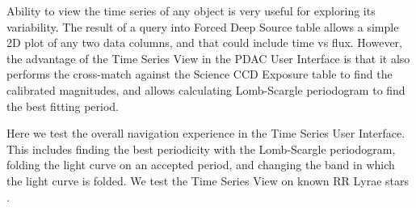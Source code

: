 \documentclass[DM,lsstdraft,toc,usenatbib]{lsstdoc}
\begin{document}
Ability to view the time series of any object is very useful for exploring its variability. The result of a query into Forced Deep Source table allows a simple 2D plot of any two data columns, and that could include time vs flux. However,  the advantage of the Time Series View in the PDAC User Interface is that it also performs the cross-match against the Science CCD Exposure table to find the calibrated magnitudes, and allows calculating Lomb-Scargle periodogram to find the best fitting period.  

Here we test the overall navigation experience in the Time Series User Interface. This includes finding the best periodicity with the Lomb-Scargle periodogram, folding the light curve on an accepted period, and changing the band in which the light curve is folded. We test the Time Series View on known RR Lyrae stars \citep{sesar2010}. 
\end{document}
